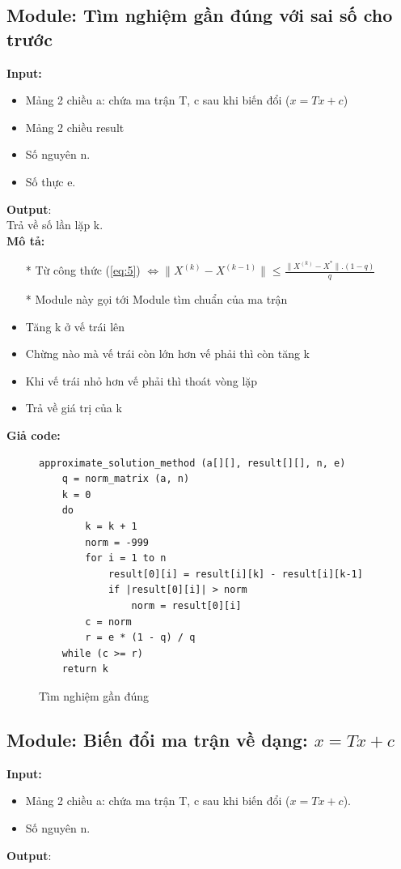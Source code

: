 \documentclass[twoside]{report2}
\begin{document}
\newpage

\subsection{Module: Tìm nghiệm gần đúng với sai số cho trước}
\textbf{Input:}
\begin{itemize}
\item Mảng 2 chiều a: chứa ma trận T, c sau khi biến đổi ($x = Tx + c$)
\item Mảng 2 chiều result
\item Số nguyên n.
\item Số thực e.
\end{itemize}
\textbf{Output}:\\

\quad Trả về số lần lặp k.\\

\textbf{Mô tả:}
\begin{itemize}
\item[*] Từ công thức (\ref{eq:5}) $\Leftrightarrow \big\| X^{(k)} - X^{(k-1)}\big\| \leq \frac{\big\| X^{(k)} - X^*\big\|.(1-q)}{q}$
\item[*] Module này gọi tới Module tìm chuẩn của ma trận
\item Tăng k ở vế trái lên
\item Chừng nào mà vế trái còn lớn hơn vế phải thì còn tăng k
\item Khi vế trái nhỏ hơn vế phải thì thoát vòng lặp
\item Trả về giá trị của k

\end{itemize}

\textbf{Giả code:}
\begin{figure}[h]
\begin{lstlisting}[frame=single]
approximate_solution_method (a[][], result[][], n, e)
    q = norm_matrix (a, n)
    k = 0
    do
    	k = k + 1
        norm = -999
        for i = 1 to n
            result[0][i] = result[i][k] - result[i][k-1]
            if |result[0][i]| > norm
                norm = result[0][i]
        c = norm
        r = e * (1 - q) / q
    while (c >= r)
    return k
\end{lstlisting}
\caption{Tìm nghiệm gần đúng}
\end{figure}

\newpage
\subsection{Module: Biến đổi ma trận về dạng: $x = Tx + c$}
\textbf{Input:}
\begin{itemize}
\item Mảng 2 chiều a: chứa ma trận T, c sau khi biến đổi ($x = Tx + c$).
\item Số nguyên n.
\end{itemize}
\textbf{Output}:\\
\end{document}
